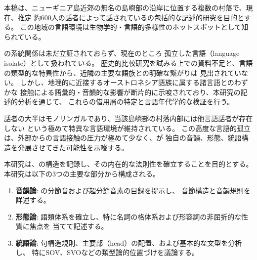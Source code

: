 \label{sec:introduction}

本稿は、ニューギニア島近郊の無名の島嶼部の沿岸に位置する複数の村落で、現在、推定
約600人の話者によって話されている\langname の包括的な記述的研究を目的とする。
この地域の言語環境は生物学的・言語的多様性のホットスポットとして知られている。

\langname の系統関係は未だ立証されておらず、現在のところ
孤立した言語（language isolate）として扱われている。
歴史的比較研究を試みる上での資料不足と、言語の類型的な特異性から、近隣の主要な語族との明確な繋がりは
見出されていない。
しかし、地理的に近接するオーストロネシア語族に属する諸言語とのわずかな
接触による語彙的・音韻的な影響が断片的に示唆されており、本研究の記述的分析を通じて、
これらの借用層の特定と言語年代学的な検証を行う。

\langname 話者の大半はモノリンガルであり、当該島嶼部の村落内部には他言語話者が存在しない
という極めて特異な言語環境が維持されている。
この高度な言語的孤立は、外部からの言語接触の圧力が極めて少なく、\langname が
独自の音韻、形態、統語構造を発展させてきた可能性を示唆する。

本研究は、\langname の構造を記録し、その内在的な法則性を確立することを目的とする。
本研究は以下の3つの主要な部分から構成される。

\begin{enumerate}
    \item \textbf{音韻論}: \langname の分節音および超分節音素の目録を提示し、
    音節構造と音韻規則を詳述する。
    \item \textbf{形態論}: 語類体系を確立し、特に名詞の格体系および形容詞の非屈折的な性質に焦点を
    当てて記述する。
    \item \textbf{統語論}: 句構造規則、主要部（head）の配置、および基本的な文型を分析し、
    特にSOV、SVOなどの類型論的位置づけを議論する。
\end{enumerate}